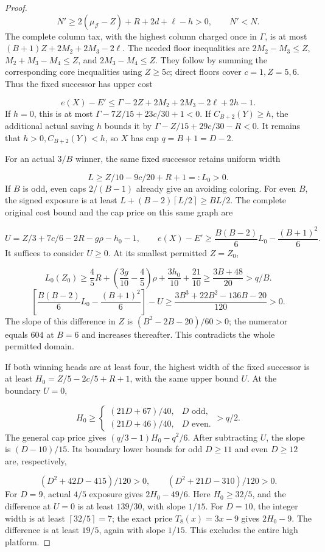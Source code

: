 \documentclass[11pt,a4paper]{article}
\newcommand{\ceil}[1]{\left\lceil#1\right\rceil}
\theoremstyle{definition}
\begin{document}
\begin{proof}
\[
N'\ge2(\mu_{\mathcal J}-Z)+R+2d+\ell-h>0,\qquad N'<N.
\]
The complete column tax, with the highest column charged once in $\Gamma$,
is at most $(B+1)Z+2M_2+2M_3-2\ell$.
The needed floor inequalities are
$2M_2-M_3\le Z$, $M_2+M_3-M_4\le Z$, and $2M_3-M_4\le Z$.
They follow by summing the corresponding core inequalities using $Z\ge5c$;
direct floors cover $c=1,Z=5,6$.
Thus the fixed successor has upper cost

\[
e(X)-E'\le\Gamma-2Z+2M_2+2M_3-2\ell+2h-1.
\]
If $h=0$, this is at most $\Gamma-7Z/15+23c/30+1<0$.
If $C_{B+2}(Y)\ge h$, the additional actual saving $h$ bounds it by
$\Gamma-Z/15+29c/30-R<0$.
It remains that $h>0,C_{B+2}(Y)<h$, so $X$ has cap $q=B+1=D-2$.

For an actual $3/B$ winner, the same fixed successor retains uniform width

\[
L\ge Z/10-9c/20+R+1=:L_0>0.
\]
If $B$ is odd, even caps $2/(B-1)$ already give an avoiding coloring.
For even $B$, the signed exposure is at least
$L+(B-2)\ceil{L/2}\ge BL/2$.
The complete original cost bound and the cap price on this same graph are

\[
U=Z/3+7c/6-2R-g\rho-h_0-1,\qquad
e(X)-E'\ge \frac{B(B-2)}6L_0-\frac{(B+1)^2}6.
\]
It suffices to consider $U\ge0$. At its smallest permitted $Z=Z_0$,

\[
L_0(Z_0)\ge\frac45R+
\left(\frac{3g}{10}-\frac45\right)\rho+\frac{3h_0}{10}+\frac{21}{10}
\ge\frac{3B+48}{20}>q/B.
\]
\[
\left[\frac{B(B-2)}6L_0-\frac{(B+1)^2}6\right]-U
\ge\frac{3B^3+22B^2-136B-20}{120}>0.
\]
The slope of this difference in $Z$ is $(B^2-2B-20)/60>0$;
the numerator equals $604$ at $B=6$ and increases thereafter.
This contradicts the whole permitted domain.

If both winning heads are at least four, the highest width of the fixed
successor is at least $H_0=Z/5-2c/5+R+1$, with the same upper bound $U$.
At the boundary $U=0$,

\[
H_0\ge
\begin{cases}
(21D+67)/40,&D\text{ odd},\\
(21D+46)/40,&D\text{ even}.
\end{cases}
>q/2.
\]
The general cap price gives $(q/3-1)H_0-q^2/6$.
After subtracting $U$, the slope is $(D-10)/15$.
Its boundary lower bounds for odd $D\ge11$ and even $D\ge12$ are, respectively,

\[
(D^2+42D-415)/120>0,\qquad
(D^2+21D-310)/120>0.
\]
For $D=9$, actual $4/5$ exposure gives $2H_0-49/6$.
Here $H_0\ge32/5$, and the difference at $U=0$ is at least $139/30$,
with slope $1/15$.
For $D=10$, the integer width is at least $\ceil{32/5}=7$;
the exact price $T_8(x)=3x-9$ gives $2H_0-9$.
The difference is at least $19/5$, again with slope $1/15$.
This excludes the entire high platform.


\end{proof}
\end{document}
